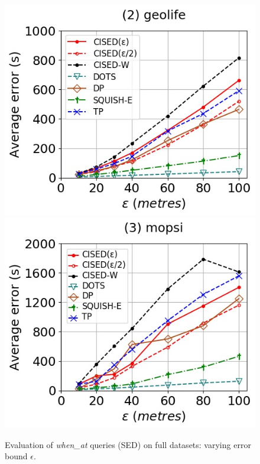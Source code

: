 {\begin{figure}[tb!]
	\includegraphics[scale = 0.350]{Figures/Exp-when-SED-error-epsilon-geolife.jpg}\hspace{0.5ex}
	\includegraphics[scale = 0.350]{Figures/Exp-when-SED-error-epsilon-mopsi.jpg}
	\vspace{-2ex}
	\caption{\small {Evaluation of \emph{when\_at} queries (SED) on full datasets: varying error bound $\epsilon$.}}
	\label{fig:query-when-sed-epsilon}
	\vspace{-1.0ex}
\end{figure}
\begin{figure}[tb!]

\end{figure}}
